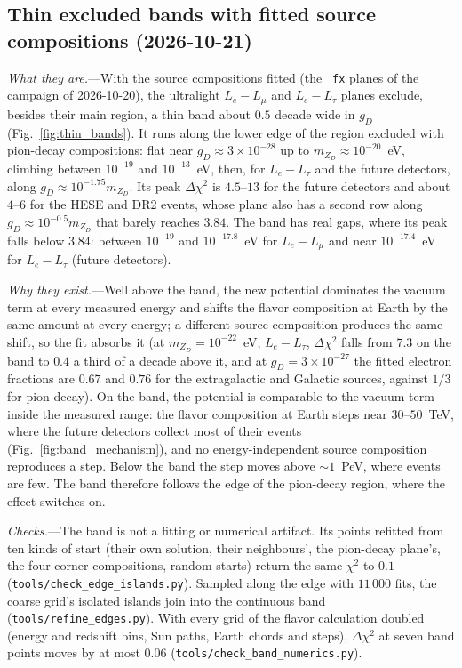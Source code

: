 \documentclass[11pt,a4paper]{article}
\newcommand{\file}[1]{\nolinkurl{#1}}
\newcommand{\mzd}{m_{Z_D}}
\newcommand{\gd}{g_D}
\begin{document}
\subsection{Thin excluded bands with fitted source compositions (2026-10-21)}
\label{sec:thinbands}

\textit{What they are.}---With the source compositions fitted (the \texttt{\_fx} planes of the
campaign of 2026-10-20), the ultralight $L_e - L_\mu$ and $L_e - L_\tau$ planes exclude, besides
their main region, a thin band about $0.5$ decade wide in $\gd$
(Fig.~\ref{fig:thin_bands}). It runs along the lower edge of the region excluded with pion-decay
compositions: flat near $\gd\approx3\times10^{-28}$ up to $\mzd\approx10^{-20}$~eV, climbing
between $10^{-19}$ and $10^{-13}$~eV, then, for $L_e - L_\tau$ and the future detectors, along
$\gd\approx10^{-1.75}\mzd$. Its peak $\Delta\chi^2$ is $4.5$--$13$ for the future detectors and
about $4$--$6$ for the HESE and DR2 events, whose plane also has a second row along
$\gd\approx10^{-0.5}\mzd$ that barely reaches $3.84$. The band has real gaps, where its peak
falls below $3.84$: between $10^{-19}$ and $10^{-17.8}$~eV for $L_e - L_\mu$ and near $10^{-17.4}$~eV for
$L_e - L_\tau$ (future detectors).

\textit{Why they exist.}---Well above the band, the new potential dominates the vacuum term at
every measured energy and shifts the flavor composition at Earth by the same amount at every
energy; a different source composition produces the same shift, so the fit absorbs it (at
$\mzd = 10^{-22}$~eV, $L_e - L_\tau$, $\Delta\chi^2$ falls from $7.3$ on the band to $0.4$ a third
of a decade above it, and at $\gd = 3\times10^{-27}$ the fitted electron fractions are $0.67$ and
$0.76$ for the extragalactic and Galactic sources, against $1/3$ for pion decay). On the band, the potential is comparable to the vacuum term inside the measured range:
the flavor composition at Earth steps near $30$--$50$~TeV, where the future detectors collect most
of their events (Fig.~\ref{fig:band_mechanism}), and no energy-independent source composition
reproduces a step. Below the band the step moves above $\sim1$~PeV, where events are few. The
band therefore follows the edge of the pion-decay region, where the effect switches on.

\textit{Checks.}---The band is not a fitting or numerical artifact. Its points refitted from ten
kinds of start (their own solution, their neighbours', the pion-decay plane's, the four corner
compositions, random starts) return the same $\chi^2$ to $0.1$ (\file{tools/check\_edge\_islands.py}).
Sampled along the edge with $11\,000$ fits, the coarse grid's isolated islands join into the
continuous band (\file{tools/refine\_edges.py}). With every grid of the flavor calculation doubled
(energy and redshift bins, Sun paths, Earth chords and steps), $\Delta\chi^2$ at seven band points
moves by at most $0.06$ (\file{tools/check\_band\_numerics.py}).
\end{document}
